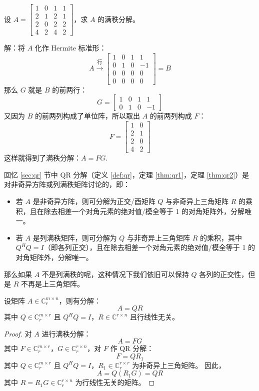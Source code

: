 \begin{example}
设 $A=\begin{bmatrix}1&0&1&1\\2&1&2&1\\2&0&2&2\\4&2&4&2\end{bmatrix}$，求 $A$ 的满秩分解。

解：将 $A$ 化作 Hermite 标准形：
\[
    A\xrightarrow{\text{行}}\begin{bmatrix}1&0&1&1\\0&1&0&-1\\0&0&0&0\\0&0&0&0\end{bmatrix}=B
\]
那么 $G$ 就是 $B$ 的前两行：
\[
    G=\begin{bmatrix}1&0&1&1\\0&1&0&-1\end{bmatrix}
\]
又因为 $B$ 的前两列构成了单位阵，所以取出 $A$ 的前两列构成 $F$：
\[
    F=\begin{bmatrix}1&0\\2&1\\2&0\\4&2\end{bmatrix}
\]
这样就得到了满秩分解：$A=FG$.
\end{example}


回忆 \ref{sec:qr} 节中 QR 分解（定义 \ref{def:qr}，定理 \ref{thm:qr1}，定理 \ref{thm:qr2}）是对非奇异方阵或列满秩矩阵讨论的，即：
\begin{itemize}
    \item 若 $A$ 是非奇异方阵，则可分解为正交/酉矩阵 $Q$ 与非奇异上三角矩阵 $R$ 的乘积，且在除去相差一个对角元素的绝对值/模全等于 1 的对角矩阵外，分解唯一。
    \item 若 $A$ 是列满秩矩阵，则可分解为 $Q$ 与非奇异上三角矩阵 $R$ 的乘积，其中 $Q^HQ=I$（即各列正交），且在除去相差一个对角元素的绝对值/模全等于 1 的对角矩阵外，分解唯一。
\end{itemize}
那么如果 $A$ 不是列满秩的呢，这种情况下我们依旧可以保持 $Q$ 各列的正交性，但是 $R$ 不再是上三角矩阵。

\begin{theorem}
设矩阵 $A\in\mathbb C^{m\times n}_r$，则有分解：
\[A=QR\]
其中 $Q\in\mathbb C^{m\times r}_r$ 且 $Q^HQ=I$，$R\in\mathbb C^{r\times n}$ 且行线性无关。
\end{theorem}

\begin{proof}
对 $A$ 进行满秩分解：
\[
    A=FG
\]
其中 $F\in\mathbb C^{m\times r}_r$，$G\in\mathbb C^{r\times n}_r$，对 $F$ 作 QR 分解：
\[
    F=QR_1
\]
其中 $Q\in\mathbb C^{m\times r}_r$ 且 $Q^HQ=I$，$R_1\in\mathbb C^{r\times r}_r$ 为非奇异上三角矩阵。 
因此，
\[
    A=Q(R_1G)=QR
\]
其中 $R=R_1G\in\mathbb C^{r\times n}_r$ 为行线性无关的矩阵。
\end{proof}


